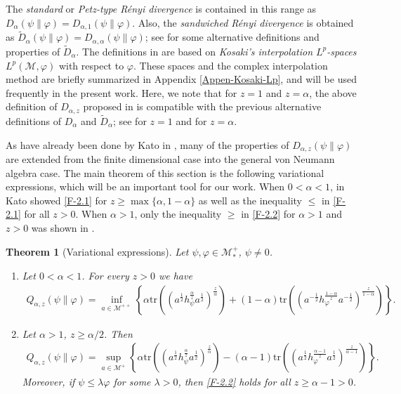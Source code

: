 \documentclass[12pt]{article}
\newtheorem{theorem}{Theorem}[section]
\theoremstyle{definition}
\theoremstyle{remark}
\numberwithin{equation}{section}
\def\Me{\mathcal M}
\def\Tr{\mathrm{tr}}
\def\ffi{\varphi}
\begin{document}
The \emph{standard} or \emph{Petz-type R\'enyi divergence}
\cite{petz1985quasi,hiai2018quantum,hiai2021quantum} is contained in this range as
$D_\alpha(\psi\|\varphi)=D_{\alpha,1}(\psi\|\varphi)$. Also, the \emph{sandwiched R\'enyi divergence} is
obtained as $\tilde D_\alpha(\psi\|\varphi)=D_{\alpha,\alpha}(\psi\|\varphi)$; see
\cite{berta2018renyi,hiai2021quantum,jencova2018renyi, jencova2021renyi} for some
alternative definitions and properties of $\tilde D_\alpha$. The definitions in
\cite{jencova2018renyi,jencova2021renyi} are based on \emph{Kosaki's interpolation $L^p$-spaces}
$L^p(\Me,\varphi)$ \cite{kosaki1984applications} with respect to $\varphi$. These spaces and the
complex interpolation method are briefly summarized in Appendix \ref{Appen-Kosaki-Lp}, and will be used
frequently in the present work. Here, we note that for $z=1$ and $z=\alpha$, the above
definition of $D_{\alpha,z}$ proposed in \cite{kato2023aremark, kato2023onrenyi} is compatible with the
previous alternative definitions of $D_\alpha$ and $\tilde D_\alpha$; see \cite[Theorem 3.6]{hiai2021quantum}
for $z=1$ and \cite[Lemma 9]{kato2023aremark} for $z=\alpha$.


As have already been done by Kato in \cite{kato2023onrenyi}, many of the properties of
$D_{\alpha,z}(\psi\|\varphi)$ are extended from the finite dimensional case into the general von Neumann
algebra case. {\color{red}The main theorem of this section is the following variational expressions, which will
be an important tool for our work. When $0<\alpha<1$, in \cite{kato2023onrenyi} Kato showed \eqref{F-2.1} for
$z\ge\max\{\alpha,1-\alpha\}$ as well as the inequality $\le$ in \eqref{F-2.1} for all $z>0$. When $\alpha>1$,
only the inequality $\ge$ in \eqref{F-2.2} for $\alpha>1$ and $z>0$ was shown in \cite{kato2023onrenyi}.}

\begin{theorem}[Variational expressions]\label{thm:variational} Let $\psi,\varphi\in \Me_*^+$, $\psi\ne 0$. 
\begin{enumerate}
\item[(i)] Let $0<\alpha<1$. {\color{red}For every $z>0$ we have}
\begin{align}\label{F-2.1}
Q_{\alpha,z}(\psi\|\varphi)=\inf_{a\in \Me^{++}}\left\{\alpha
\Tr\left((a^{\frac12}h_\psi^{\frac{\alpha}{z}}a^{\frac12})^{\frac{z}{\alpha}}\right)+(1-\alpha)
\Tr\left((a^{-\frac12}h_\varphi^{\frac{1-\alpha}{z}}a^{-\frac12})^{\frac{z}{1-\alpha}}\right) \right\}.
\end{align}

\item[(ii)] Let $\alpha>1$, {\color{red}$z\ge\alpha/2$.} Then
\begin{align}\label{F-2.2}
Q_{\alpha,z}(\psi\|\varphi)=\sup_{a\in \Me^+} \left\{\alpha
\Tr\left((a^{\frac12}h_\psi^{\frac{\alpha}{z}}a^{\frac12})^{\frac{z}{\alpha}}\right)-(\alpha-1)
\Tr\left((a^{\frac12}h_\varphi^{\frac{\alpha-1}{z}}a^{\frac12})^{\frac{z}{\alpha-1}}\right) \right\}.
\end{align}
Moreover, if $\psi\le\lambda\ffi$ for some $\lambda>0$, then \eqref{F-2.2} holds for all
$z\ge\alpha-1>0$.
\end{enumerate}
\end{theorem}
\end{document}

